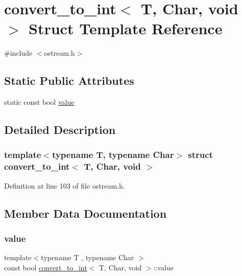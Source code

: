 \hypertarget{structconvert__to__int_3_01_t_00_01_char_00_01void_01_4}{}\section{convert\+\_\+to\+\_\+int$<$ T, Char, void $>$ Struct Template Reference}
\label{structconvert__to__int_3_01_t_00_01_char_00_01void_01_4}


{\ttfamily \#include $<$ostream.\+h$>$}

\subsection*{Static Public Attributes}
\begin{DoxyCompactItemize}
\item 
static const bool \hyperlink{structconvert__to__int_3_01_t_00_01_char_00_01void_01_4_a3450c3073c3440cb778d87b3cecfebe1}{value}
\end{DoxyCompactItemize}


\subsection{Detailed Description}
\subsubsection*{template$<$typename T, typename Char$>$\newline
struct convert\+\_\+to\+\_\+int$<$ T, Char, void $>$}



Definition at line 103 of file ostream.\+h.



\subsection{Member Data Documentation}
\mbox{\label{structconvert__to__int_3_01_t_00_01_char_00_01void_01_4_a3450c3073c3440cb778d87b3cecfebe1}} 
\subsubsection{\texorpdfstring{value}{value}}
{\footnotesize\ttfamily template$<$typename T , typename Char $>$ \\
const bool \hyperlink{structconvert__to__int}{convert\+\_\+to\+\_\+int}$<$ T, Char, void $>$\+::value\hspace{0.3cm}{\ttfamily [static]}}

